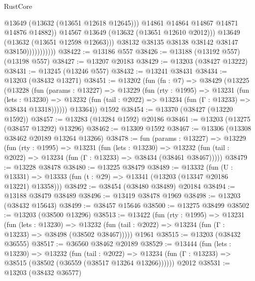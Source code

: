 \begin{lexlean}{RustCore}
\begin{coremodule}
                                    @13649
                                    (@13632 (@13651 @12618 @12645)))
                                  @14861
                                  @14864
                                  @14867
                                  @14871
                                  @14876
                                  @14882))
                              @14567
                              @13649
                              (@13632 (@13651 @12610 @2012)))
                            @13649
                            (@13632 (@13651 @12598 @12663)))
                          @38132
                          @38135
                          @38138
                          @38142
                          @38147
                          @38150)))))))))))
@38422 := @13186 @557
@38426 := @13188 (@13192 @557) (@13198 @557)
@38427 := @13207 @20183
@38429 := @13203 (@38427 @13222)
@38431 := @13245 (@13246 @557)
@38432 := @13241 @38431
@38434 := @13203 (@38432 @13271)
@38451 := @13202
    (fun (fn : @7) =>
    @38429
      (@13225
        (@13228
          (fun (params : @13227) =>
          @13229
            (fun (rty : @1995) =>
            @13231
              (fun (lets : @13230) =>
              @13232 (fun (tail : @2022) => @13234 (fun (Γ : @13233) => @38434 @13318))))))
        @13364))
    @1592
@38454 := @13370 (@38427 (@13220 @1592))
@38457 := @13283 (@13284 @1592) @20186
@38461 := @13203 (@13275 (@38457 @13292) @13296)
@38462 := @13309 @1592
@38467 := @13306 (@13308 @38462 @20189 @13264 @13266)
@38478 := fun (params : @13227) =>
  @13229
    (fun (rty : @1995) =>
    @13231
      (fun (lets : @13230) =>
      @13232 (fun (tail : @2022) => @13234 (fun (Γ : @13233) => @38434 (@38461 @38467)))))
@38479 := @13228 @38478
@38480 := @13225 @38479
@38489 := @13332
    (fun (U : @13331) => @13333 (fun (t : @29) => @13341 (@13203 (@13347 @20186 @13221) @13358)))
@38492 := @38454 (@38480 @38489) @20184
@38494 := @13188 @38479 @38489
@38496 := @13419 @38478 @1969
@38498 := @13203 (@38432 @15643)
@38499 := @38457 @15646
@38500 := @13275 @38499
@38502 := @13203 (@38500 @13296)
@38513 := @13422
    (fun (rty : @1995) =>
    @13231
      (fun (lets : @13230) =>
      @13232 (fun (tail : @2022) => @13234 (fun (Γ : @13233) => @38498 (@38502 @38467)))))
    @1961
@38515 := @13203 (@38432 @36555)
@38517 := @36560 @38462 @20189
@38529 := @13444
    (fun (lets : @13230) =>
    @13232
      (fun (tail : @2022) =>
      @13234 (fun (Γ : @13233) => @38515 (@38502 (@36559 (@38517 @13264 @13266))))))
    @2012
@38531 := @13203 (@38432 @36577)

\end{coremodule}
\end{lexlean}
